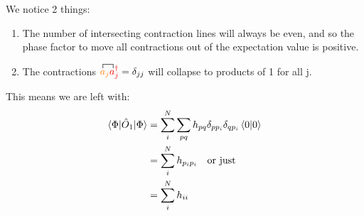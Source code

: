 \documentclass{article}
\newcommand{\dg}{\ensuremath{^\dagger} }
\begin{document}
We notice 2 things: 
\begin{enumerate}
\item The number of intersecting contraction lines will always be even, and so the phase factor to move all contractions out of the expectation value is positive.
\item The contractions $\contraction{}{a}{{}_p}{a} {\color{orange} a_{j}}{\color{red} a_j\dg }=  \delta_{jj}$ will collapse to products of 1 for all j. 
\end{enumerate}
This means we are left with: 
\begin{align*}
\braket{\Phi | \hat{O}_1 | \Phi} &= \sum_i^N  \sum_{pq}   h_{pq} \delta_{p p_i}   \delta_{q p_i}  \braket{0| 0} \\
&= \sum_i^N h_{p_i p_i}  \quad \text{or just }\\
&= \sum_i^N h_{i i} 
\end{align*}
\end{document}
